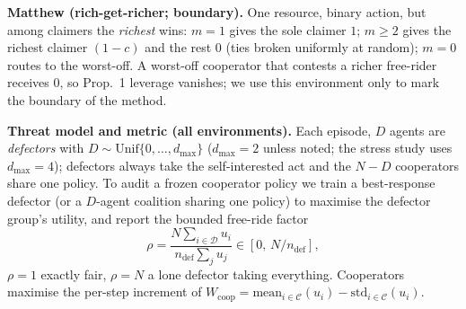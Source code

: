 \documentclass[conference, a4paper]{IEEEtran}
\begin{document}
\textbf{Matthew (rich-get-richer; boundary).} One resource, binary action, but among
claimers the \emph{richest} wins: $m{=}1$ gives the sole claimer $1$; $m\ge2$ gives
the richest claimer $(1{-}c)$ and the rest $0$ (ties broken uniformly at random);
$m{=}0$ routes to the worst-off. A worst-off cooperator that contests a richer
free-rider receives $0$, so Prop.~1 leverage vanishes; we use this environment only
to mark the boundary of the method.

\textbf{Threat model and metric (all environments).} Each episode, $D$ agents are
\emph{defectors} with $D\sim\mathrm{Unif}\{0,\dots,d_{\max}\}$ ($d_{\max}{=}2$ unless
noted; the stress study uses $d_{\max}{=}4$); defectors always take the
self-interested act and the $N{-}D$ cooperators share one policy. To audit a frozen
cooperator policy we train a best-response defector (or a $D$-agent coalition sharing
one policy) to maximise the defector group's utility, and report the bounded
free-ride factor
\begin{equation*}
\rho=\frac{N\sum_{i\in\mathcal{D}}u_i}{\,n_{\mathrm{def}}\sum_j u_j\,}\in[0,\,N/n_{\mathrm{def}}],
\end{equation*}
$\rho{=}1$ exactly fair, $\rho{=}N$ a lone defector taking everything. Cooperators
maximise the per-step increment of
$W_{\mathrm{coop}}{=}\mathrm{mean}_{i\in\mathcal{C}}(u_i){-}\mathrm{std}_{i\in\mathcal{C}}(u_i)$.
\end{document}

